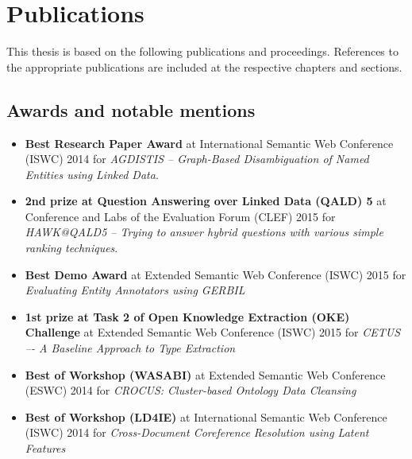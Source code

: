 \chapter*{Publications}

This thesis is based on the following publications and proceedings.
References to the appropriate publications are included at the respective chapters and sections.

\bigskip


\section*{Awards and notable mentions}
\begin{itemize}
    \item \textbf{Best Research Paper Award} at International Semantic Web Conference (ISWC) 2014 for \textit{AGDISTIS -- Graph-Based Disambiguation of Named Entities using Linked Data}.
    \item \textbf{2nd prize at Question Answering over Linked Data (QALD) 5} at Conference and Labs of the Evaluation Forum (CLEF) 2015 for \textit{HAWK@QALD5 -- Trying to answer hybrid questions with various simple ranking techniques}.
    \item \textbf{Best Demo Award} at Extended Semantic Web Conference (ISWC) 2015 for \textit{Evaluating Entity Annotators using GERBIL}
    \item \textbf{1st prize at Task 2 of Open Knowledge Extraction (OKE) Challenge} at Extended Semantic Web Conference (ISWC) 2015 for \textit{CETUS –- A Baseline Approach to Type Extraction}
    \item \textbf{Best of Workshop (WASABI)} at Extended Semantic Web Conference (ESWC) 2014 for \textit{CROCUS: Cluster-based Ontology Data Cleansing}
    \item \textbf{Best of Workshop (LD4IE)} at International Semantic Web Conference (ISWC) 2014 for \textit{Cross-Document Coreference Resolution using Latent Features} 
\end{itemize}

